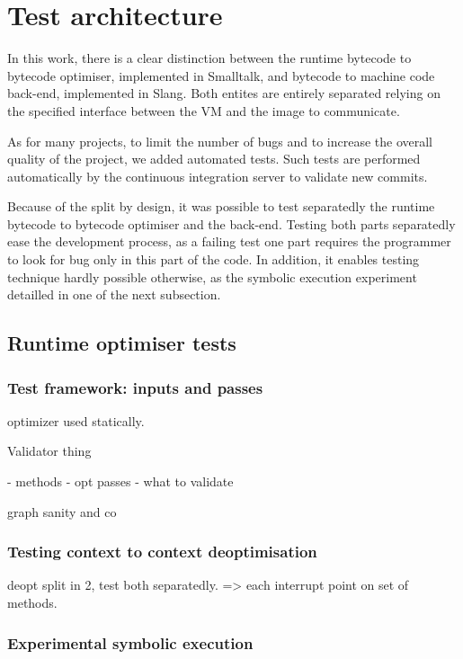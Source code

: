\documentclass[a4paper,12pt,twoside]{../includes/ThesisStyle}
\begin{document}
\fi

\chapter{Test architecture}
\label{chap:tests}
\minitoc

In this work, there is a clear distinction between the runtime bytecode to bytecode optimiser, implemented in Smalltalk, and bytecode to machine code back-end, implemented in Slang. Both entites are entirely separated relying on the specified interface between the VM and the image to communicate.

As for many projects, to limit the number of bugs and to increase the overall quality of the project, we added automated tests. Such tests are performed automatically by the continuous integration server to validate new commits.

Because of the split by design, it was possible to test separatedly the runtime bytecode to bytecode optimiser and the back-end. Testing both parts separatedly ease the development process, as a failing test one part requires the programmer to look for bug only in this part of the code. In addition, it enables testing technique hardly possible otherwise, as the symbolic execution experiment detailled in one of the next subsection.

\section{Runtime optimiser tests}

\subsection{Test framework: inputs and passes}

optimizer used statically.

Validator thing

- methods
- opt passes
- what to validate

graph sanity and co

\subsection{Testing context to context deoptimisation}

deopt split in 2, test both separatedly. => each interrupt point on set of methods.

\subsection{Experimental symbolic execution}
\end{document}

